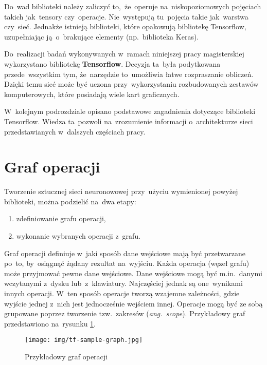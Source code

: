 Do~wad biblioteki należy zaliczyć to,~że~operuje na~niskopoziomowych pojęciach takich jak~tensory czy~operacje.
Nie~występują tu~pojęcia takie jak~warstwa czy~sieć. Jednakże istnieją biblioteki, które opakowują bibliotekę
Tensorflow, uzupełniając ją~o~brakujące elementy (np.~biblioteka Keras).

Do~realizacji badań wykonywanych w~ramach niniejszej pracy magisterskiej wykorzystano bibliotekę \textbf{Tensorflow}.
Decyzja ta~była podytkowana przede~wszystkim tym, że~narzędzie to~umożliwia łatwe rozpraszanie obliczeń. Dzięki temu
sieć może być uczona przy~wykorzystaniu rozbudowanych zestawów komputerowych, które posiadają wiele kart graficznych.

W~kolejnym podrozdziale opisano podstawowe zagadnienia dotyczące biblioteki Tensorflow. Wiedza ta~pozwoli na~zrozumienie
informacji o~architekturze sieci przedstawianych w~dalszych częściach pracy.

\section{Graf operacji} \label{sec:graf-operacji}
\begin{minipage}[t]{\textwidth}
    Tworzenie sztucznej sieci neuronowowej przy~użyciu wymienionej powyżej biblioteki, można podzielić na~dwa etapy:
    \begin{enumerate}
        \item zdefiniowanie grafu operacji,
        \item wykonanie wybranych operacji z~grafu.
    \end{enumerate}
\end{minipage}

Graf operacji definiuje w~jaki sposób dane wejściowe mają być przetwarzane po~to, by~osiągnąć żądany rezultat
na~wyjściu. Każda operacja (węzeł grafu) może przyjmować pewne dane wejściowe. Dane wejściowe mogą być m.in.~danymi
wczytanymi z~dysku lub~z~klawiatury. Najczęściej jednak są one~wynikami innych operacji. W~ten sposób operacje tworzą
wzajemne zależności, gdzie wyjście jednej z~nich jest jednocześnie wejściem innej. Operacje mogą być ze sobą grupowane
poprzez tworzenie tzw.~zakresów (\textit{ang.~scope}). Przykładowy graf przedstawiono na~rysunku \ref{img:tf-smpl-grf}.

\begin{figure}[H]
	\centering
	\texttt{[image: img/tf-sample-graph.jpg]}
	\caption{Przykładowy graf operacji}
	\label{img:tf-smpl-grf}
\end{figure}

